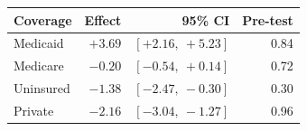 \begin{tabular}{@{}lrrr@{}}
\toprule
\textbf{Coverage} & \textbf{Effect} & \textbf{95\% CI} & \textbf{Pre-test} \\
\midrule
Medicaid & $+3.69$ & $[+2.16,\ +5.23]$ & 0.84 \\
Medicare & $-0.20$ & $[-0.54,\ +0.14]$ & 0.72 \\
Uninsured & $-1.38$ & $[-2.47,\ -0.30]$ & 0.30 \\
Private & $-2.16$ & $[-3.04,\ -1.27]$ & 0.96 \\
\bottomrule
\end{tabular}
